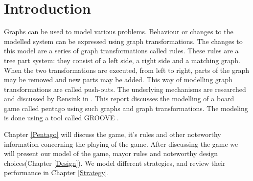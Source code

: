 \section{Introduction}
\label{Introduction}
Graphs can be used to model various problems.
Behaviour or changes to the modelled system can be expressed using graph transformations.
The changes to this model are a series of graph transformations called rules.
These rules are a tree part system: they consist of a left side, a right side and a matching graph.
When the two transformations are executed, from left to right, parts of the graph may be removed and new parts may be added.
This way of modelling graph transformations are called push-outs.
The underlying mechanisms are researched and discussed by Rensink in \cite{Rensink2006}.
This report discusses the modelling of a board game called pentago using such graphs and graph transformations. 
The modeling is done using a tool called GROOVE \cite{tool-groove}.

\vspace{6pt}

Chapter \ref{Pentago} will discuss the game, it's rules and other noteworthy information concerning the playing of the game. 
After discussing the game we will present our model of the game, mayor rules and noteworthy design choices(Chapter \ref{Design}).
We model different strategies, and review their performance in Chapter \ref{Strategy}.